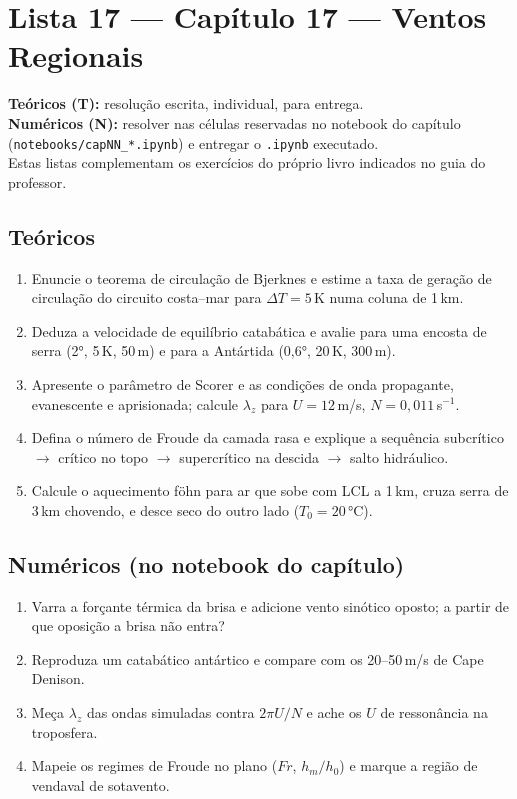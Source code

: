 \documentclass[11pt]{article}
\newcommand{\instrucoes}{%
\begin{caixalista}
\textbf{Teóricos (T):} resolução escrita, individual, para entrega.\\
\textbf{Numéricos (N):} resolver nas células reservadas no notebook do
capítulo (\texttt{notebooks/capNN\_*.ipynb}) e entregar o
\texttt{.ipynb} executado.\\
Estas listas complementam os exercícios do próprio livro indicados no
guia do professor.
\end{caixalista}}
\begin{document}
\clearpage
\section*{Lista 17 --- Capítulo 17 --- Ventos Regionais}
\instrucoes

\subsection*{Teóricos}

\begin{enumerate}[label=\textbf{T\arabic*.},itemsep=4pt]
  \item Enuncie o teorema de circulação de Bjerknes e estime a taxa de
        geração de circulação do circuito costa--mar para
        $\Delta T = 5$\,K numa coluna de 1\,km.
  \item Deduza a velocidade de equilíbrio catabática e avalie para uma
        encosta de serra (2°, 5\,K, 50\,m) e para a Antártida
        (0{,}6°, 20\,K, 300\,m).
  \item Apresente o parâmetro de Scorer e as condições de onda
        propagante, evanescente e aprisionada; calcule $\lambda_z$
        para $U = 12$\,m/s, $N = 0{,}011$\,s$^{-1}$.
  \item Defina o número de Froude da camada rasa e explique a
        sequência subcrítico $\to$ crítico no topo $\to$ supercrítico
        na descida $\to$ salto hidráulico.
  \item Calcule o aquecimento föhn para ar que sobe com LCL a 1\,km,
        cruza serra de 3\,km chovendo, e desce seco do outro lado
        ($T_0 = 20\,°$C).
\end{enumerate}

\subsection*{Numéricos (no notebook do capítulo)}

\begin{enumerate}[label=\textbf{N\arabic*.},itemsep=4pt]
  \item Varra a forçante térmica da brisa e adicione vento sinótico
        oposto; a partir de que oposição a brisa não entra?
  \item Reproduza um catabático antártico e compare com os
        20--50\,m/s de Cape Denison.
  \item Meça $\lambda_z$ das ondas simuladas contra $2\pi U/N$ e ache
        os $U$ de ressonância na troposfera.
  \item Mapeie os regimes de Froude no plano ($Fr$, $h_m/h_0$) e
        marque a região de vendaval de sotavento.
\end{enumerate}
\end{document}

